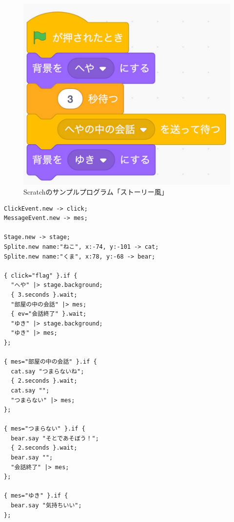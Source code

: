 \documentclass[10pt,a4j]{ltjsarticle}
\begin{document}
\begin{figure}[H]
\begin{minipage}[b]{0.33\linewidth}
  \end{minipage}
  \begin{minipage}[b]{0.33\linewidth}
    \centering
    \includegraphics[keepaspectratio, scale=0.3]{images/sample02-2.pdf}
  \end{minipage}
  \caption{Scratchのサンプルプログラム「ストーリー風」}
  \label{fig:sample02}
\end{figure}

\begin{lstlisting}[caption=本言語のサンプルプログラム「ストーリー風」, label=sample02]
ClickEvent.new -> click;
MessageEvent.new -> mes;

Stage.new -> stage;
Splite.new name:"ねこ", x:-74, y:-101 -> cat;
Splite.new name:"くま", x:78, y:-68 -> bear;

{ click="flag" }.if {
  "へや" |> stage.background;
  { 3.seconds }.wait;
  "部屋の中の会話" |> mes;
  { ev="会話終了" }.wait;
  "ゆき" |> stage.background;
  "ゆき" |> mes;
};

{ mes="部屋の中の会話" }.if {
  cat.say "つまらないね";
  { 2.seconds }.wait;
  cat.say "";
  "つまらない" |> mes;
};

{ mes="つまらない" }.if {
  bear.say "そとであそぼう！";
  { 2.seconds }.wait;
  bear.say "";
  "会話終了" |> mes;
};

{ mes="ゆき" }.if {
  bear.say "気持ちいい";
};
\end{lstlisting}
\clearpage
\end{document}
